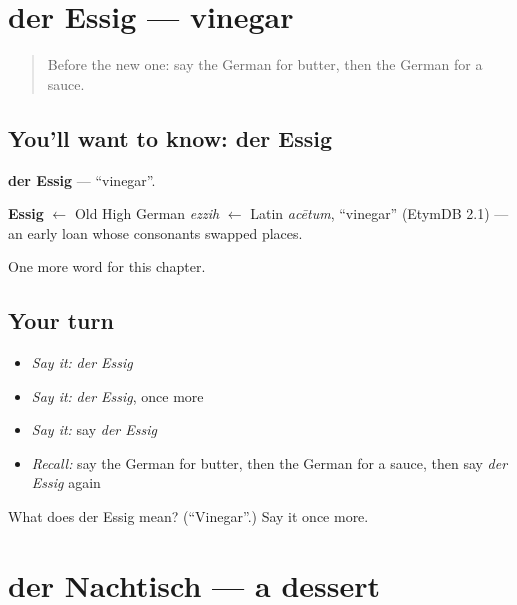 \section[der Essig]{der Essig — vinegar}

\label{lesson:GE-C123-essig}



\begin{quote}
Before the new one: say the German for butter, then the German for a sauce.
\end{quote}

\subsection*{You'll want to know: der Essig}
\textbf{der Essig} — \textquotedblleft{}vinegar\textquotedblright{}.

\begin{cousinweb}
\textbf{Essig} $\leftarrow$ Old High German \emph{ezzih} $\leftarrow$ Latin \emph{acētum}, \textquotedblleft{}vinegar\textquotedblright{} (EtymDB 2.1) — an early loan whose consonants swapped places.
\end{cousinweb}

\begin{grammarlens}[title={What you've built}]
One more word for this chapter.
\end{grammarlens}

\subsection*{Your turn}
\begin{itemize}
\raggedright
  \item \emph{Say it:} \emph{der Essig}
  \item \emph{Say it:} \emph{der Essig}, once more
  \item \emph{Say it:} say \emph{der Essig}
  \item \emph{Recall:} say the German for butter, then the German for a sauce, then say \emph{der Essig} again
\end{itemize}

\begin{tcolorbox}[breakable,colback=teal!4,colframe=teal!35!black,title={Before you move on}]
What does der Essig mean? (\textquotedblleft{}Vinegar\textquotedblright{}.) Say it once more.
\end{tcolorbox}
\section[der Nachtisch]{der Nachtisch — a dessert}

